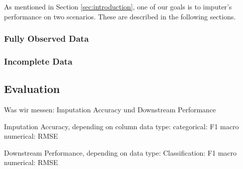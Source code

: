 As mentioned in Section \ref{sec:introduction}, one of our goals is to imputer's performance on two scenarios. These are described in the following sections.


\subsubsection{Fully Observed Data}
%



\subsubsection{Incomplete Data}
%


\subsection{Evaluation}
%
Was wir messen:
Imputation Accuracy und Downstream Performance

Imputation Accuracy, depending on column data type:
categorical: F1 macro
numerical: RMSE

Downstream Performance, depending on data type:
Classification: F1 macro
numerical: RMSE
